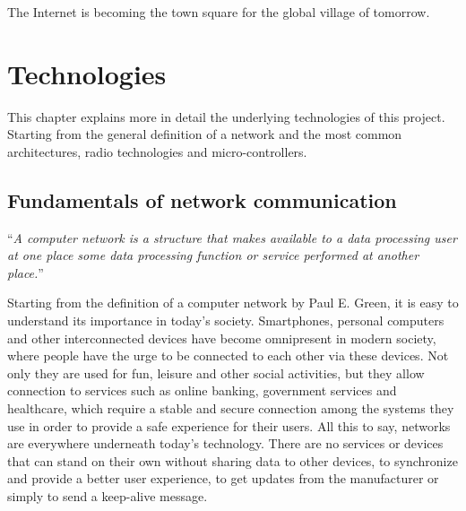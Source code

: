
\begin{savequote}[70mm]
	The Internet is becoming the town square for the global village of tomorrow.
\end{savequote}


\chapter{Technologies}\label{chapter:technologies}
	
	This chapter explains more in detail the underlying technologies of this project.
	Starting from the general definition of a network and the most common architectures, radio technologies and micro-controllers.
		
	\section{Fundamentals of network communication}
		
		\begin{center}
			\begin{minipage}[H]{0.9\columnwidth}
				\begin{center}
					``\textit{A computer network is a structure that makes available to a data processing user at one place some data processing function or service performed at another place.}'' \cite{nla.cat-vn252493}
				\end{center}
			\end{minipage}
		\end{center}
	
		Starting from the definition of a computer network by Paul E. Green, it is easy to understand its importance in today's society.
		Smartphones, personal computers and other interconnected devices have become omnipresent in modern society, where people have the urge to be connected to each other via these devices.
		Not only they are used for fun, leisure and other social activities, but they allow connection to services such as online banking, government services and healthcare, which require a stable and secure connection among the systems they use in order to provide a safe experience for their users.
		All this to say, networks are everywhere underneath today's technology.
		There are no services or devices that can stand on their own without sharing data to other devices, to synchronize and provide a better user experience, to get updates from the manufacturer or simply to send a keep-alive message.
		
